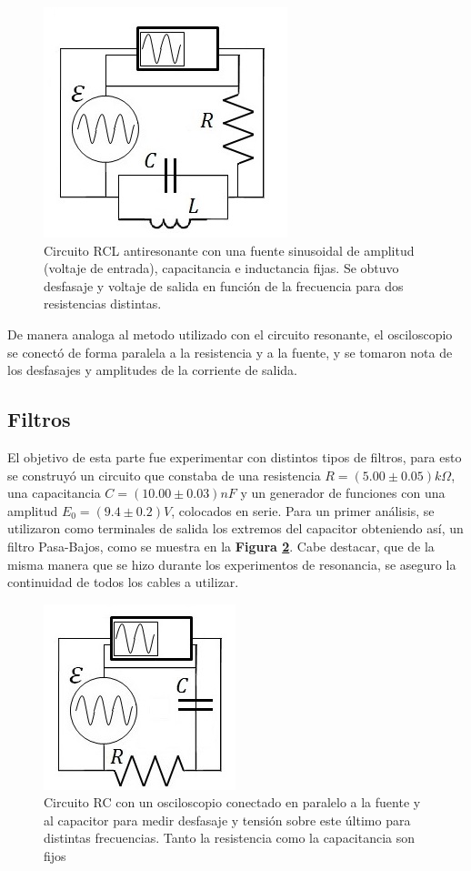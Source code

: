 \documentclass[11pt,a4paper]{article}
\begin{document}
\begin{figure}[h]
\centering
\includegraphics[scale=0.7]{Circuito-RCL-AntiResonante}
  \caption{Circuito RCL antiresonante con una fuente sinusoidal de amplitud (voltaje de entrada), capacitancia e inductancia fijas. Se obtuvo desfasaje y voltaje de salida en función de la frecuencia para dos resistencias distintas.}
  \label{fig:RCL-ARes}
\end{figure}

De manera analoga al metodo utilizado con el circuito resonante, el osciloscopio se conectó de forma paralela a la resistencia y a la fuente, y se tomaron nota de los desfasajes y amplitudes de la corriente de salida.


\subsection{Filtros}

El objetivo de esta parte fue experimentar con distintos tipos de filtros, para esto se construyó un circuito que constaba de una resistencia $R = (5.00 \pm 0.05)k\Omega$, una capacitancia $C = (10.00 \pm 0.03)nF$ y un generador de funciones con una amplitud $E_{0} = (9.4 \pm 0.2)V$, colocados en serie. Para un primer análisis, se utilizaron como terminales de salida los extremos del capacitor obteniendo así, un filtro Pasa-Bajos, como se muestra en la \textbf{Figura \ref{fig:RC-PB}}. Cabe destacar, que de la misma manera que se hizo durante los experimentos de resonancia, se aseguro la continuidad de todos los cables a utilizar.

\begin{figure}[h]
\centering
\includegraphics[scale=0.9]{Circuito-RC-Pasa-Bajos}
  \caption{Circuito RC con un osciloscopio conectado en paralelo a la fuente y al capacitor para medir desfasaje y tensión sobre este último para distintas frecuencias. Tanto la resistencia como la capacitancia son fijos}
  \label{fig:RC-PB}
\end{figure}
\end{document}
